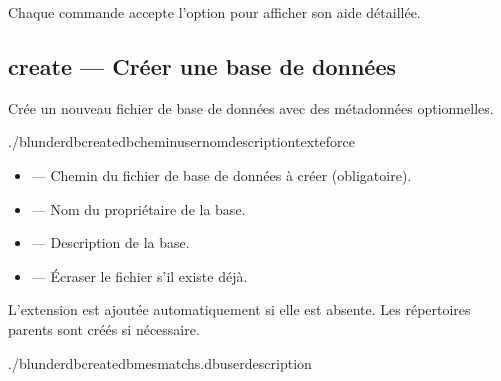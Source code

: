 \documentclass[letterpaper,10pt,french]{sphinxmanual}
\begin{document}
\sphinxAtStartPar
Chaque commande accepte l’option  pour afficher son aide détaillée.


\subsection{create — Créer une base de données}
\label{\detokenize{cli:create-creer-une-base-de-donnees}}
\sphinxAtStartPar
Crée un nouveau fichier de base de données avec des métadonnées optionnelles.

\begin{sphinxVerbatim}[commandchars=\\\{\}]
./blunderdbcreate\PYGZhy{}\PYGZhy{}db\PYGZlt{}chemin\PYGZgt{}\PYG{o}{[}\PYGZhy{}\PYGZhy{}user\PYGZlt{}nom\PYGZgt{}\PYG{o}{]}\PYG{o}{[}\PYGZhy{}\PYGZhy{}description\PYGZlt{}texte\PYGZgt{}\PYG{o}{]}\PYG{o}{[}\PYGZhy{}\PYGZhy{}force\PYG{o}{]}
\end{sphinxVerbatim}

\sphinxAtStartPar
{}
\begin{itemize}
\item {} 
\sphinxAtStartPar
{} — Chemin du fichier de base de données à créer (obligatoire).

\item {} 
\sphinxAtStartPar
{} — Nom du propriétaire de la base.

\item {} 
\sphinxAtStartPar
{} — Description de la base.

\item {} 
\sphinxAtStartPar
{} — Écraser le fichier s’il existe déjà.

\end{itemize}

\sphinxAtStartPar
L’extension  est ajoutée automatiquement si elle est absente. Les
répertoires parents sont créés si nécessaire.

\sphinxAtStartPar
{}

\begin{sphinxVerbatim}[commandchars=\\\{\}]
./blunderdbcreate\PYGZhy{}\PYGZhy{}dbmes\PYGZus{}matchs.db\PYGZhy{}\PYGZhy{}user\PYGZhy{}\PYGZhy{}description
\end{sphinxVerbatim}
\end{document}
